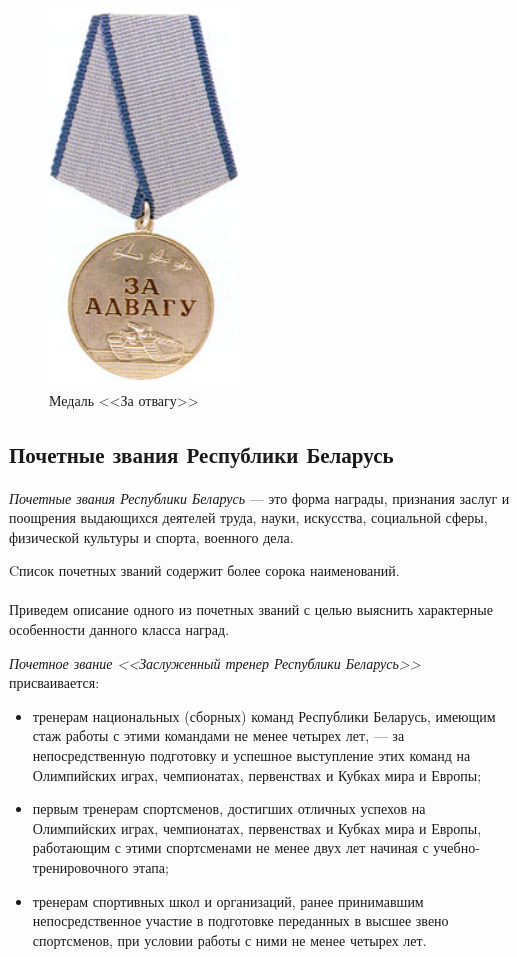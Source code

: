\begin{figure}[h]
  \centering
  \includegraphics[width=50mm]{pic/medal_otvaga.jpg}
  \caption{Медаль <<За отвагу>>}
  \label{fig:medal_otvaga}
\end{figure}

\subsection{Почетные звания Республики Беларусь}

\paragraph{}
\textit{Почетные звания Республики Беларусь} --- это форма награды,
признания заслуг и поощрения выдающихся деятелей труда, науки, искусства,
социальной сферы, физической культуры и спорта, военного дела.

Cписок почетных званий содержит более сорока наименований.

\paragraph{}
Приведем описание одного из почетных званий с целью выяснить
характерные особенности данного класса наград.

\textit{Почетное звание <<Заслуженный тренер Республики Беларусь>>}
присваивается:

\begin{itemize}
\item
  тренерам национальных (сборных) команд Республики Беларусь,
  имеющим стаж работы с этими командами не менее четырех лет,
  --- за непосредственную подготовку и успешное выступление этих команд
  на Олимпийских играх, чемпионатах, первенствах и Кубках мира и Европы;
\item
  первым тренерам спортсменов, достигших отличных успехов
  на Олимпийских играх, чемпионатах, первенствах и Кубках мира и Европы,
  работающим с этими спортсменами не менее двух лет начиная
  с учебно-тренировочного этапа;
\item
  тренерам спортивных школ и организаций, ранее принимавшим
  непосредственное участие в подготовке переданных в высшее
  звено спортсменов, при условии работы с ними не менее четырех лет.
\end{itemize}

